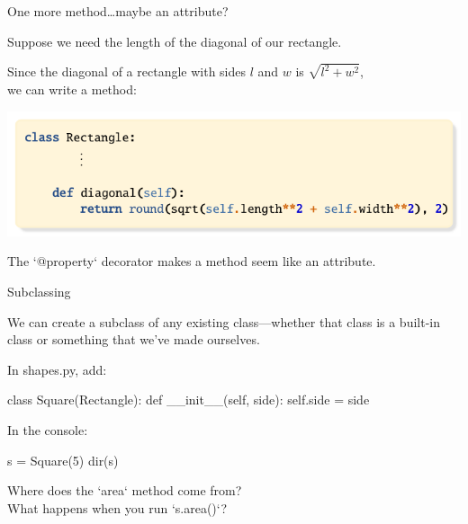 \documentclass[aspectratio=149] {beamer}
\begin{document}
\begin{frame}[fragile]{One more method\dots maybe an attribute?}
  
  Suppose we need the length of the diagonal of our rectangle.
  
  \pause \smallskip
  
  Since the diagonal of a rectangle with sides $l$ and $w$ 
  is $\sqrt{l^2 + w^2}$,\\[-1pt]
  we can write a method:
  
  \smallskip \pause
   
  \includegraphics[page=2]{diagonal}
  
  The \inline`@property` decorator makes a method seem like an
  attribute.
  
  
\end{frame}




\begin{frame}[fragile]{Subclassing}

  We can create a subclass of any existing class---whether that class is a built-in class or something that we've made ourselves.

  \medskip \pause

  In shapes.py, add:
  \begin{pythoncode}
    class Square(Rectangle):
        def __init__(self, side):
            self.side = side
  \end{pythoncode}

  \medskip \pause

  In the console:
  \begin{pythoncode}
    s = Square(5)
    dir(s)
  \end{pythoncode}

  \pause

  Where does the \inline`area` method come from? \\
  What happens when you run \inline`s.area()`?

\end{frame}
\end{document}
